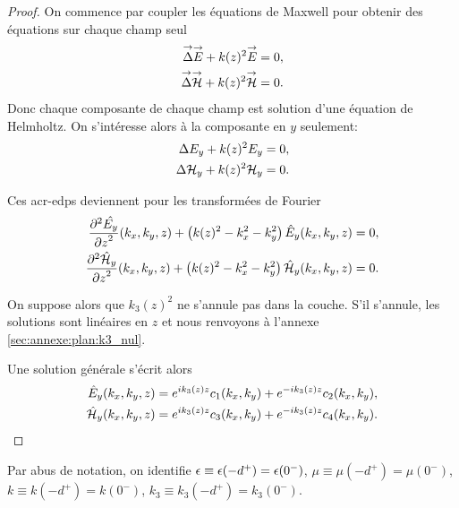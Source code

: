     \begin{proof}
      On commence par coupler les équations de Maxwell pour obtenir des équations sur chaque champ seul
      \begin{align*}
        \vlapl{\vE} + k(z)^2 \vE & = 0,
        \\
        \vlapl{\vH} + k(z)^2 \vH & = 0.
      \end{align*}
      Donc chaque composante de chaque champ est solution d'une équation de Helmholtz.
      On s’intéresse alors à la composante en \(y\) seulement:
      \begin{align*}
        \lapl{E_y} + k(z)^2 E_y & = 0,
        \\
        \lapl{\cH_y} + k(z)^2 \cH_y & = 0.
      \end{align*}

      Ces \glspl{acr-edp} deviennent pour les transformées de Fourier
      \begin{align*}
        \ddr[2]{z}{\hat{E_y}}(k_x,k_y,z) + \left( k(z)^2 - k_x^2 - k_y^2\right) \hat{E}_y(k_x,k_y,z) & = 0,
        \\
        \ddr[2]{z}{\hat{\cH}_y}(k_x,k_y,z) + \left( k(z)^2 - k_x^2 - k_y^2\right) \hat{\cH}_y(k_x,k_y,z) & = 0.
      \end{align*}

      On suppose alors que \(k_3(z)^2\) ne s'annule pas dans la couche. S'il s'annule, les solutions sont linéaires en \(z\) et nous renvoyons à l'annexe \ref{sec:annexe:plan:k3_nul}.

      Une solution générale s'écrit alors
      \begin{align*}
        \hat{E}_y(k_x,k_y,z) & = e^{ik_3(z)z}c_1(k_x,k_y) + e^{-ik_3(z)z}c_2(k_x,k_y),
        \\
        \hat{\cH}_y(k_x,k_y,z) & = e^{ik_3(z)z}c_3(k_x,k_y) + e^{-ik_3(z)z}c_4(k_x,k_y).
      \end{align*}
    \end{proof}

    Par abus de notation, on identifie  \(\eps\equiv \eps(-d^+)=\eps(0^-)\), \(\mu\equiv\mu(-d^+)=\mu(0^-)\), \(k\equiv k(-d^+)=k(0^-)\), \(k_3 \equiv k_3(-d^+) = k_3(0^-)\).



